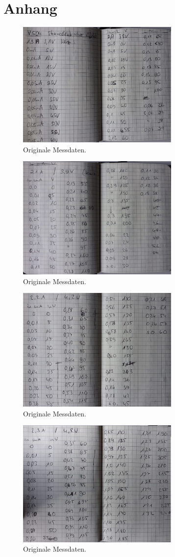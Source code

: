 \section{Anhang}
\begin{figure}[H]
\centering
\includegraphics[width=8cm]{a1.png}
\caption{Originale Messdaten.}
\end{figure}
\begin{figure}[H]
\centering
\includegraphics[width=8cm]{a2.png}
\caption{Originale Messdaten.}
\end{figure}
\begin{figure}[H]
\centering
\includegraphics[width=8cm]{a3.png}
\caption{Originale Messdaten.}
\end{figure}
\begin{figure}[H]
\centering
\includegraphics[width=8cm]{a4.png}
\caption{Originale Messdaten.}
\end{figure}
